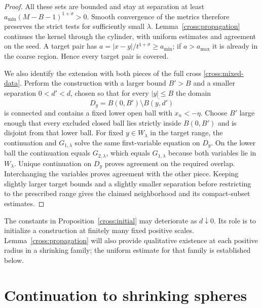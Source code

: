 \documentclass[11pt]{article}
\theoremstyle{definition}
\theoremstyle{remark}
\numberwithin{equation}{section}
\begin{document}
\begin{proof}
All these sets are bounded and stay at separation at least
$a_{\min}(M-B-1)^{1+\sigma}>0$.  Smooth convergence of the metrics
therefore preserves the strict tests for sufficiently small $\lambda$.
Lemma~\ref{cross:propagation} continues the kernel through the cylinder,
with uniform estimates and agreement on the seed.  A target pair has
$a=|x-y|/t^{1+\sigma}\ge a_{\min}$; if $a>a_{\max}$ it is already in
the coarse region.  Hence every target pair is covered.

We also identify the extension with both pieces of the full cross
\eqref{cross:mixed-data}. Perform the construction with a larger bound
$B'>B$ and a smaller separation $0<d'<d$, chosen so that for every
$|y|\le B$ the domain
\[
 D_y=B(0,B')\setminus\overline{B(y,d')}
\]
is connected and contains a fixed lower open ball with $x_n<-\eta$.
Choose $B'$ large enough that every excluded closed ball lies strictly
inside $B(0,B')$ and is disjoint from that lower ball.
For fixed $y\in W_\lambda$ in the target range, the continuation
and $G_{1,\lambda}$ solve the same first-variable equation on $D_y$.
On the lower ball the continuation equals $G_{2,\lambda}$, which equals
$G_{1,\lambda}$ because both variables lie in $W_\lambda$.
Unique continuation on $D_y$ proves agreement on the required overlap.
Interchanging the variables proves agreement with the other piece.
Keeping slightly larger target bounds and a slightly smaller separation
before restricting to the prescribed range gives the claimed neighborhood
and its compact-subset estimates.
\end{proof}

The constants in Proposition~\ref{cross:initial} may deteriorate as
$d\downarrow0$.  Its role is to initialize a construction at finitely
many fixed positive scales.  Lemma~\ref{cross:propagation} will also
provide qualitative existence at each positive radius in a shrinking
family; the uniform estimate for that family is established below.

\section{Continuation to shrinking spheres}\label{sec:balls}
\end{document}
